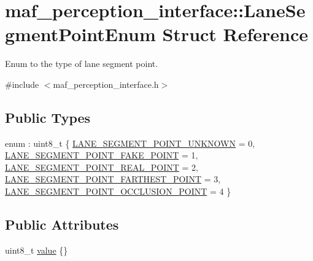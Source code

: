 \hypertarget{structmaf__perception__interface_1_1LaneSegmentPointEnum}{}\section{maf\+\_\+perception\+\_\+interface\+:\+:Lane\+Segment\+Point\+Enum Struct Reference}
\label{structmaf__perception__interface_1_1LaneSegmentPointEnum}


Enum to the type of lane segment point.  




{\ttfamily \#include $<$maf\+\_\+perception\+\_\+interface.\+h$>$}

\subsection*{Public Types}
\begin{DoxyCompactItemize}
\item 
enum \+: uint8\+\_\+t \{ \newline
\hyperlink{structmaf__perception__interface_1_1LaneSegmentPointEnum_aec11c68fd1ec024da5523f14e4bafac6af8eb4f565c6474c9519e3d549d45b01b}{L\+A\+N\+E\+\_\+\+S\+E\+G\+M\+E\+N\+T\+\_\+\+P\+O\+I\+N\+T\+\_\+\+U\+N\+K\+N\+O\+WN} = 0, 
\hyperlink{structmaf__perception__interface_1_1LaneSegmentPointEnum_aec11c68fd1ec024da5523f14e4bafac6a9ee3d3b48138e3db23f8dedaadc9b9e4}{L\+A\+N\+E\+\_\+\+S\+E\+G\+M\+E\+N\+T\+\_\+\+P\+O\+I\+N\+T\+\_\+\+F\+A\+K\+E\+\_\+\+P\+O\+I\+NT} = 1, 
\hyperlink{structmaf__perception__interface_1_1LaneSegmentPointEnum_aec11c68fd1ec024da5523f14e4bafac6aca4d1d3f6faec094a2f1a41d4a23495a}{L\+A\+N\+E\+\_\+\+S\+E\+G\+M\+E\+N\+T\+\_\+\+P\+O\+I\+N\+T\+\_\+\+R\+E\+A\+L\+\_\+\+P\+O\+I\+NT} = 2, 
\hyperlink{structmaf__perception__interface_1_1LaneSegmentPointEnum_aec11c68fd1ec024da5523f14e4bafac6ad3946713edb04fdf77d489e234a37a2b}{L\+A\+N\+E\+\_\+\+S\+E\+G\+M\+E\+N\+T\+\_\+\+P\+O\+I\+N\+T\+\_\+\+F\+A\+R\+T\+H\+E\+S\+T\+\_\+\+P\+O\+I\+NT} = 3, 
\newline
\hyperlink{structmaf__perception__interface_1_1LaneSegmentPointEnum_aec11c68fd1ec024da5523f14e4bafac6abf3e0665fc8040c619f11fc0fc5700e9}{L\+A\+N\+E\+\_\+\+S\+E\+G\+M\+E\+N\+T\+\_\+\+P\+O\+I\+N\+T\+\_\+\+O\+C\+C\+L\+U\+S\+I\+O\+N\+\_\+\+P\+O\+I\+NT} = 4
 \}
\end{DoxyCompactItemize}
\subsection*{Public Attributes}
\begin{DoxyCompactItemize}
\item 
uint8\+\_\+t \hyperlink{structmaf__perception__interface_1_1LaneSegmentPointEnum_a44fac195891a7e39497ba0ae4a4538d9}{value} \{\}
\end{DoxyCompactItemize}


